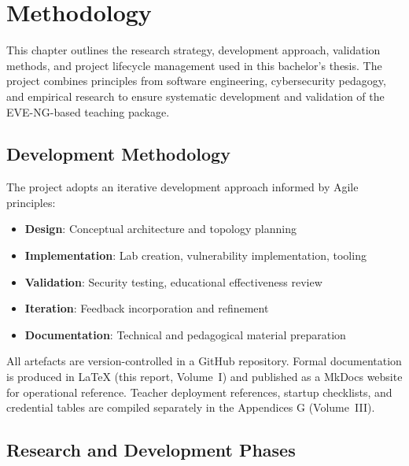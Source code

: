
\chapter{Methodology}\label{ch:methodology}

This chapter outlines the research strategy, development approach, validation methods, and
project lifecycle management used in this bachelor's thesis. The project combines
principles from software engineering, cybersecurity pedagogy, and empirical research to
ensure systematic development and validation of the EVE-NG\cite{eve_ng}-based teaching package.

\section{Development Methodology}

The project adopts an iterative development approach informed by Agile principles:

\begin{itemize}
  \item \textbf{Design}: Conceptual architecture and topology planning
  \item \textbf{Implementation}: Lab creation, vulnerability implementation, tooling
  \item \textbf{Validation}: Security testing, educational effectiveness review
  \item \textbf{Iteration}: Feedback incorporation and refinement
  \item \textbf{Documentation}: Technical and pedagogical material preparation
\end{itemize}

All artefacts are version-controlled in a GitHub repository. Formal documentation is produced
in LaTeX (this report, Volume~I) and published as a MkDocs website for operational reference.
Teacher deployment references, startup checklists, and credential tables are compiled
separately in the Appendices G (Volume~III).

\section{Research and Development Phases}

